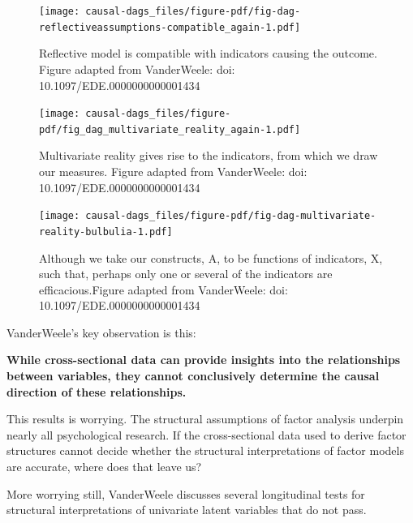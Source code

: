 \documentclass[
  singlecolumn]{report}
\begin{document}
\begin{figure}

{\centering \texttt{[image: causal-dags\_files/figure-pdf/fig-dag-reflectiveassumptions-compatible\_again-1.pdf]}

}

\caption{\label{fig-dag-reflectiveassumptions-compatible_again}Reflective
model is compatible with indicators causing the outcome. Figure adapted
from VanderWeele: doi: 10.1097/EDE.0000000000001434}

\end{figure}

\begin{figure}

{\centering \texttt{[image: causal-dags\_files/figure-pdf/fig\_dag\_multivariate\_reality\_again-1.pdf]}

}

\caption{Multivariate reality gives rise to the indicators, from which
we draw our measures. Figure adapted from VanderWeele: doi:
10.1097/EDE.0000000000001434}

\end{figure}

\begin{figure}

{\centering \texttt{[image: causal-dags\_files/figure-pdf/fig-dag-multivariate-reality-bulbulia-1.pdf]}

}

\caption{\label{fig-dag-multivariate-reality-bulbulia}Although we take
our constructs, A, to be functions of indicators, X, such that, perhaps
only one or several of the indicators are efficacious.Figure adapted
from VanderWeele: doi: 10.1097/EDE.0000000000001434}

\end{figure}

VanderWeele's key observation is this:

\textbf{While cross-sectional data can provide insights into the
relationships between variables, they cannot conclusively determine the
causal direction of these relationships.}

This results is worrying. The structural assumptions of factor analysis
underpin nearly all psychological research. If the cross-sectional data
used to derive factor structures cannot decide whether the structural
interpretations of factor models are accurate, where does that leave us?

More worrying still, VanderWeele discusses several longitudinal tests
for structural interpretations of univariate latent variables that do
not pass.
\end{document}
